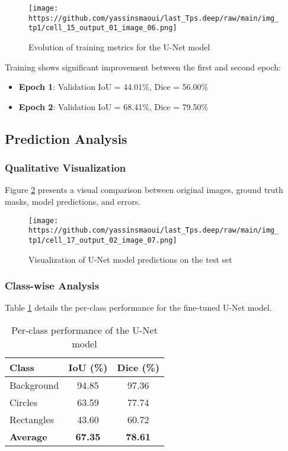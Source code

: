 \documentclass[12pt,a4paper]{article}
\begin{document}
\begin{figure}[H]
    \centering
    \texttt{[image: https://github.com/yassinsmaoui/last\_Tps.deep/raw/main/img\_tp1/cell\_15\_output\_01\_image\_06.png]}
    \caption{Evolution of training metrics for the U-Net model}
    \label{fig:training_curves}
\end{figure}

Training shows significant improvement between the first and second epoch:
\begin{itemize}
    \item \textbf{Epoch 1}: Validation IoU = 44.01\%, Dice = 56.00\%
    \item \textbf{Epoch 2}: Validation IoU = 68.41\%, Dice = 79.50\%
\end{itemize}

\subsection{Prediction Analysis}

\subsubsection{Qualitative Visualization}

Figure \ref{fig:predictions_visualization} presents a visual comparison between original images, ground truth masks, model predictions, and errors.

\begin{figure}[H]
    \centering
    \texttt{[image: https://github.com/yassinsmaoui/last\_Tps.deep/raw/main/img\_tp1/cell\_17\_output\_02\_image\_07.png]}
    \caption{Visualization of U-Net model predictions on the test set}
    \label{fig:predictions_visualization}
\end{figure}

\subsubsection{Class-wise Analysis}

Table \ref{tab:class_performance} details the per-class performance for the fine-tuned U-Net model.

\begin{table}[H]
\centering
\caption{Per-class performance of the U-Net model}
\label{tab:class_performance}
\begin{tabular}{@{}lcc@{}}
\toprule
\textbf{Class} & \textbf{IoU (\%)} & \textbf{Dice (\%)} \\
\midrule
Background & 94.85 & 97.36 \\
Circles & 63.59 & 77.74 \\
Rectangles & 43.60 & 60.72 \\
\midrule
\textbf{Average} & \textbf{67.35} & \textbf{78.61} \\
\bottomrule
\end{tabular}
\end{table}
\end{document}
